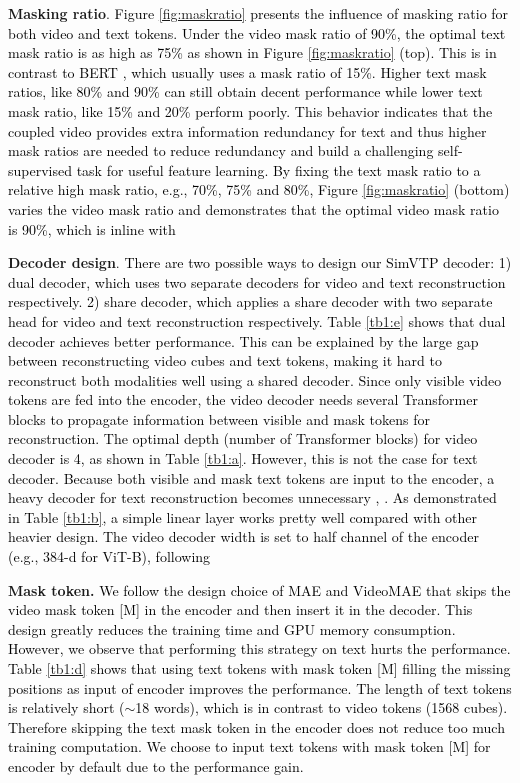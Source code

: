 \documentclass[10pt,twocolumn,letterpaper]{article}
\newcommand{\yty}[1]{\textcolor{black}{#1}}
\begin{document}
\noindent\textbf{Masking ratio}.
\yty{Figure \ref{fig:maskratio} presents the influence of masking ratio for both video and text tokens.  Under the video mask ratio of 90\%, the optimal text mask ratio is as high as 75\% as shown in Figure \ref{fig:maskratio} (top). This is in contrast to BERT \cite{devlin2018bert}, which usually uses a mask ratio of 15\%.  Higher text mask ratios, like 80\% and 90\% can still obtain decent performance while lower text mask ratio, like 15\% and 20\% perform poorly. This behavior indicates that the coupled video provides extra information redundancy for text and thus higher mask ratios are needed to reduce redundancy and build a challenging self-supervised task for useful feature learning. By fixing the text mask ratio to a relative high mask ratio, e.g., 70\%, 75\% and 80\%, Figure \ref{fig:maskratio} (bottom) varies the video mask ratio and demonstrates that the optimal video mask ratio is 90\%, which is inline with \cite{tong2022videomae}}



\noindent\textbf{Decoder design}. 
\yty{There are two possible ways to design our SimVTP decoder: 1) dual decoder, which uses two separate decoders for video and text reconstruction respectively. 2) share decoder, which applies a share decoder with two separate head for video and text reconstruction respectively.  Table \ref{tb1:e} shows that dual decoder achieves better performance. This can be explained by the large gap between reconstructing video cubes and text tokens, making it hard to reconstruct both modalities well using a shared decoder. Since only visible video tokens are fed into the encoder, the video decoder needs several Transformer blocks to propagate information between visible and mask tokens for reconstruction. The optimal depth (number of Transformer blocks) for video decoder is 4, as shown in Table \ref{tb1:a}. However, this is not the case for text decoder. Because both visible and mask text tokens are input to the encoder, a heavy decoder for text reconstruction becomes unnecessary \cite{devlin2018bert, xie2022simmim}, . As demonstrated in Table \ref{tb1:b}, a simple linear layer works pretty well compared with other heavier design. The video decoder width is set to half channel of the encoder (e.g., 384-d for ViT-B), following \cite{tong2022videomae}}



\noindent\textbf{Mask token.}
\yty{We follow the design choice of MAE \cite{he2022masked} and VideoMAE \cite{tong2022videomae} that skips the video mask token [M] in the encoder and then insert it in the decoder. This design greatly reduces the training time and GPU memory consumption. However, we observe that performing this strategy on text hurts the performance. Table \ref{tb1:d} shows that using text tokens with mask token [M] filling the missing positions as input of encoder improves the performance. The length of text tokens is relatively short ($\sim$18 words), which is in contrast to video tokens (1568 cubes). Therefore skipping the text mask token in the encoder does not reduce too much training computation. We choose to input text tokens with mask token [M] for encoder by default due to the performance gain.}
\end{document}
